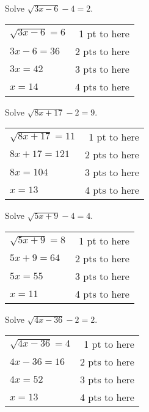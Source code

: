 {
	Solve $\displaystyle \sqrt{3x-6}-4=2$.
}
{
	\begin{tabular}{l r}
	$\sqrt{3x-6}=6$ & 1 pt to here\\
	$3x-6=36$ & 2 pts to here\\
	$3x=42$ & 3 pts to here\\
	$x=14$ & 4 pts to here \\
	\end{tabular}
}

{
	Solve $\displaystyle \sqrt{8x+17}-2=9$.
}
{
	\begin{tabular}{l r}
	$\sqrt{8x+17}=11$ & 1 pt to here\\
	$8x+17=121$ & 2 pts to here\\
	$8x=104$ & 3 pts to here\\
	$x=13$ & 4 pts to here \\
	\end{tabular}
}

{
	Solve $\displaystyle \sqrt{5x+9}-4=4$.
}
{
	\begin{tabular}{l r}
	$\sqrt{5x+9}=8$ & 1 pt to here\\
	$5x+9=64$ & 2 pts to here\\
	$5x=55$ & 3 pts to here\\
	$x=11$ & 4 pts to here \\
	\end{tabular}
}

{
	Solve $\displaystyle \sqrt{4x-36}-2=2$.
}
{
	\begin{tabular}{l r}
	$\sqrt{4x-36}=4$ & 1 pt to here\\
	$4x-36=16$ & 2 pts to here\\
	$4x=52$ & 3 pts to here\\
	$x=13$ & 4 pts to here \\
	\end{tabular}
}
